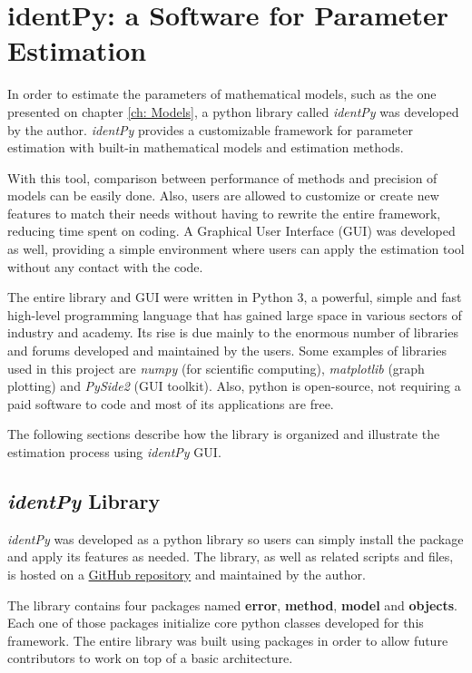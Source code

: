 \chapter{identPy: a Software for Parameter Estimation}
\label{ch: Software}

In order to estimate the parameters of mathematical models, such as the one presented on chapter \ref{ch: Models}, a python library called \textit{identPy} was developed by the author. \textit{identPy} provides a customizable framework for parameter estimation with built-in mathematical models and estimation methods. 

With this tool, comparison between performance of methods and precision of models can be easily done. Also, users are allowed to customize or create new features to match their needs without having to rewrite the entire framework, reducing time spent on coding. A Graphical User Interface (GUI) was developed as well, providing a simple environment where users can apply the estimation tool without any contact with the code.

The entire library and GUI were written in Python 3, a powerful, simple and fast high-level programming language that has gained large space in various sectors of industry and academy. Its rise is due mainly to the enormous number of libraries and forums developed and maintained by the users. Some examples of libraries used in this project are \textit{numpy} (for scientific computing), \textit{matplotlib} (graph plotting) and \textit{PySide2} (GUI toolkit). Also, python is open-source, not requiring a paid software to code and most of its applications are free.

The following sections describe how the library is organized and illustrate the estimation process using \textit{identPy} GUI.

\section{\textit{identPy} Library}

\textit{identPy} was developed as a python library so users can simply install the package and apply its features as needed. The library, as well as related scripts and files, is hosted on a \href{https://github.com/gnegrelli/identPy}{GitHub repository} and maintained by the author.

The library contains four packages named \textbf{error}, \textbf{method}, \textbf{model} and \textbf{objects}. Each one of those packages initialize core python classes developed for this framework. The entire library was built using packages in order to allow future contributors to work on top of a basic architecture.

